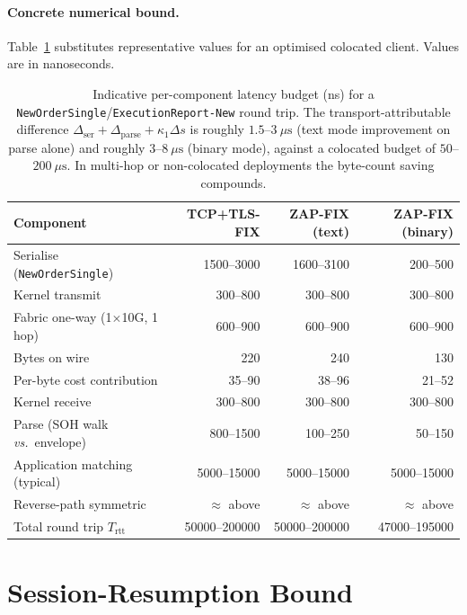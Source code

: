 \documentclass[11pt,a4paper]{article}
\begin{document}
\paragraph{Concrete numerical bound.}
Table~\ref{tab:bound} substitutes representative values for an
optimised colocated client. Values are in nanoseconds.

\begin{table}[h]
\centering
\begin{tabular}{lrrr}
\toprule
Component                                    & TCP+TLS-FIX & ZAP-FIX (text) & ZAP-FIX (binary) \\
\midrule
Serialise (\texttt{NewOrderSingle})         & 1500--3000 & 1600--3100 & 200--500 \\
Kernel transmit                              & 300--800   & 300--800   & 300--800 \\
Fabric one-way (1$\times$10G, 1 hop)         & 600--900   & 600--900   & 600--900 \\
Bytes on wire                                & 220        & 240        & 130 \\
Per-byte cost contribution                   & 35--90     & 38--96     & 21--52 \\
Kernel receive                               & 300--800   & 300--800   & 300--800 \\
Parse (SOH walk \emph{vs.}~envelope)         & 800--1500  & 100--250   & 50--150 \\
Application matching (typical)               & 5000--15000 & 5000--15000 & 5000--15000 \\
Reverse-path symmetric                       & $\approx$ above & $\approx$ above & $\approx$ above \\
\midrule
Total round trip $T_{\mathrm{rtt}}$          & 50000--200000 & 50000--200000 & 47000--195000 \\
\bottomrule
\end{tabular}
\caption{Indicative per-component latency budget (ns) for a
\texttt{NewOrderSingle}/\texttt{ExecutionReport-New} round trip.
The transport-attributable difference $\Delta_{\mathrm{ser}} +
\Delta_{\mathrm{parse}} + \kappa_1\Delta s$ is roughly
$1.5$--$3~\mu\mathrm{s}$ (text mode improvement on parse alone) and
roughly $3$--$8~\mu\mathrm{s}$ (binary mode), against a colocated
budget of $50$--$200~\mu\mathrm{s}$. In multi-hop or
non-colocated deployments the byte-count saving compounds.}
\label{tab:bound}
\end{table}

\section{Session-Resumption Bound}
\label{sec:resume}
\end{document}
